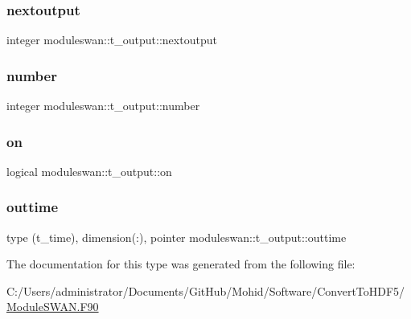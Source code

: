 \subsubsection{\texorpdfstring{nextoutput}{nextoutput}}
{\footnotesize\ttfamily integer moduleswan\+::t\+\_\+output\+::nextoutput\hspace{0.3cm}{\ttfamily [private]}}

\mbox{\label{structmoduleswan_1_1t__output_a012bef06d6074afffec39a7fe4b9b7a5}} 
\subsubsection{\texorpdfstring{number}{number}}
{\footnotesize\ttfamily integer moduleswan\+::t\+\_\+output\+::number\hspace{0.3cm}{\ttfamily [private]}}

\mbox{\label{structmoduleswan_1_1t__output_a99e2fb44f2d95302008c7cae2fe0b825}} 
\subsubsection{\texorpdfstring{on}{on}}
{\footnotesize\ttfamily logical moduleswan\+::t\+\_\+output\+::on\hspace{0.3cm}{\ttfamily [private]}}

\mbox{\label{structmoduleswan_1_1t__output_a19462811f8019ec4fad577469ddf06ae}} 
\subsubsection{\texorpdfstring{outtime}{outtime}}
{\footnotesize\ttfamily type (t\+\_\+time), dimension(\+:), pointer moduleswan\+::t\+\_\+output\+::outtime\hspace{0.3cm}{\ttfamily [private]}}



The documentation for this type was generated from the following file\+:\begin{DoxyCompactItemize}
\item 
C\+:/\+Users/administrator/\+Documents/\+Git\+Hub/\+Mohid/\+Software/\+Convert\+To\+H\+D\+F5/\mbox{\hyperlink{_module_s_w_a_n_8_f90}{Module\+S\+W\+A\+N.\+F90}}\end{DoxyCompactItemize}
